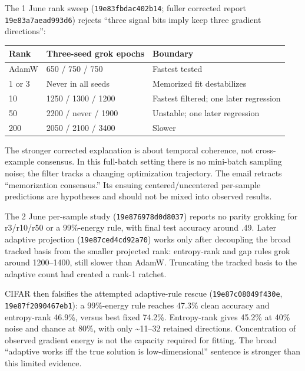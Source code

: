 \documentclass[
  british,
  10pt,
  a4paper,
]{article}
\newcounter{none} %
\begin{document}
The 1 June rank sweep (\texttt{19e83fbdac40\allowbreak{}2b14}; fuller
corrected report \texttt{19e83a7aead9\allowbreak{}93d6}) rejects ``three
signal bits imply keep three gradient directions'':

{\def\LTcaptype{none} %
\begin{longtable}[]{@{}lll@{}}
\toprule\noalign{}
Rank & Three-seed grok epochs & Boundary \\
\midrule\noalign{}
\endhead
\bottomrule\noalign{}
\endlastfoot
AdamW & 650 / 750 / 750 & Fastest tested \\
1 or 3 & Never in all seeds & Memorized fit destabilizes \\
10 & 1250 / 1300 / 1200 & Fastest filtered; one later regression \\
50 & 2200 / never / 1900 & Unstable; one later regression \\
200 & 2050 / 2100 / 3400 & Slower \\
\end{longtable}
}

The stronger corrected explanation is about temporal coherence, not
cross-\allowbreak{}example consensus. In this full-batch setting there
is no mini-batch sampling noise; the filter tracks a changing
optimization trajectory.\allowbreak{} The email retracts ``memorization
consensus.\allowbreak{}” Its ensuing centered/\allowbreak{}uncentered
per-sample predictions are hypotheses and should not be mixed into
observed results.

The 2 June per-sample study (\texttt{19e876978d0d\allowbreak{}8037})
reports no parity grokking for r3/r10/r50 or a 99\%-energy rule, with
final test accuracy around .49. Later adaptive projection
(\texttt{19e87ced4cd9\allowbreak{}2a70}) works only after decoupling the
broad tracked basis from the smaller projected rank:
entropy-\allowbreak{}rank and gap rules grok around 1200--1400, still
slower than AdamW. Truncating the tracked basis to the adaptive count
had created a rank-1 ratchet.

CIFAR then falsifies the attempted adaptive-\allowbreak{}rule rescue
(\texttt{19e87c08049f\allowbreak{}430e},
\texttt{19e87f209046\allowbreak{}7eb1}): a 99\%-energy rule reaches
47.3\% clean accuracy and entropy-\allowbreak{}rank 46.9\%, versus best
fixed 74.2\%. Entropy-\allowbreak{}rank gives 45.2\% at 40\% noise and
chance at 80\%, with only \textasciitilde11--32 retained
directions.\allowbreak{} Concentration of observed gradient energy is
not the capacity required for fitting. The broad ``adaptive works iff
the true solution is low-\allowbreak{}dimensional”\allowbreak{} sentence
is stronger than this limited evidence.
\end{document}
